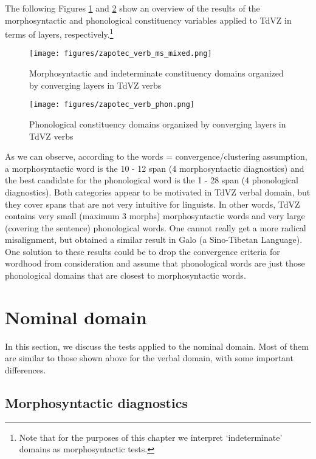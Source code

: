 \documentclass[output=paper]{langscibook}
\begin{document}
The following Figures \ref{fig:key:zap:2} and \ref{fig:key:zap:3} show an overview of the results of the morphosyntactic and phonological constituency variables applied to TdVZ in terms of layers, respectively.\footnote{Note that for the purposes of this chapter we interpret `indeterminate' domains as morphosyntactic tests.} 

\begin{figure}
    \texttt{[image: figures/zapotec\_verb\_ms\_mixed.png]}
    \caption{Morphosyntactic and indeterminate constituency domains organized by converging layers in TdVZ verbs}
    \label{fig:key:zap:2}
\end{figure}

\begin{figure}
    \texttt{[image: figures/zapotec\_verb\_phon.png]}
    \caption{Phonological constituency domains organized by converging layers in TdVZ verbs}
    \label{fig:key:zap:3}
\end{figure}

As we can observe, according to the words = convergence/clustering assumption, a morphosyntactic word is the 10 - 12 span (4 morphosyntactic diagnostics) and the best candidate for the phonological word is the 1 - 28 span (4 phonological diagnostics). Both categories appear to be motivated in TdVZ verbal domain, but they cover spans that are not very intuitive for linguists. In other words, TdVZ contains very small (maximum 3 morphs) morphosyntactic words and very large (covering the sentence) phonological words. One cannot really get a more radical misalignment, but \citet{Post2009} obtained a similar result in Galo (a Sino-Tibetan Language). One solution to these results could be to drop the convergence criteria for wordhood from consideration and assume that phonological words are just those phonological domains that are closest to morphosyntactic words.

\section{Nominal domain}\label{bkm:Ref83129272} 

In this section, we discuss the tests applied to the nominal domain. Most of them are similar to those shown above for the verbal domain, with some important differences.

\subsection{Morphosyntactic diagnostics}
\end{document}
